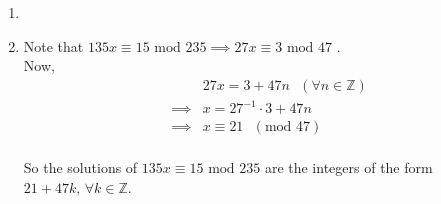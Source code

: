 \begin{enumerate}

\item

\item Note that $135x \equiv 15 \textrm{ mod } 235 \implies 27x \equiv 3
\textrm{ mod } 47$ \cite{slides_30}.\\

Now, \begin{eqnarray*}
	&& 27x = 3 + 47n \textrm{ } (\forall n \in \mathbb{Z}) \\
	&\implies& x = 27^{-1} \cdot 3 + 47n \\
	&\implies& x \equiv 21 \textrm{ } (\textrm{mod } 47) \\
\end{eqnarray*}

So the solutions of $135x \equiv 15 \textrm{ mod } 235$ are the integers of the
form $21 + 47k \textrm{, } \forall k \in \mathbb{Z}$.

\end{enumerate}
